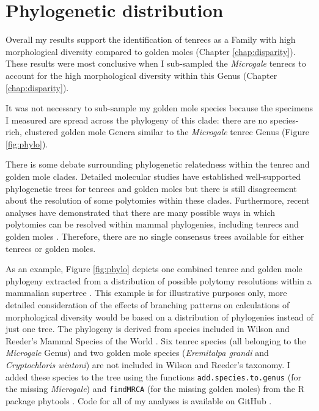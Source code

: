 
\chapter{Phylogenetic distribution}
\label{phylo}

Overall my results support the identification of tenrecs as a Family with high morphological diversity compared to golden moles (Chapter \ref{chap:disparity}). These results were most conclusive when I sub-sampled the \textit{Microgale} tenrecs to account for the high morphological diversity within this Genus (Chapter \ref{chap:disparity}).

It was not necessary to sub-sample my golden mole species because the specimens I measured are spread across the phylogeny of this clade: there are no species-rich, clustered golden mole Genera similar to the \textit{Microgale} tenrec Genus (Figure \ref{fig:phylo}).

There is some debate surrounding phylogenetic relatedness within the tenrec and golden mole clades. Detailed molecular studies have established well-supported phylogenetic trees for tenrecs \citep{Poux2008, Asher2006} and golden moles \citep{Asher2010} but there is still disagreement about the resolution of some polytomies within these clades. Furthermore, recent analyses have demonstrated that there are many possible ways in which polytomies can be resolved within mammal phylogenies, including tenrecs and golden moles \citep{Kuhn2011}. Therefore, there are no single consensus trees available for either tenrecs or golden moles.

As an example, Figure \ref{fig:phylo} depicts one combined tenrec and golden mole phylogeny extracted from a distribution of possible polytomy resolutions \citep{Kuhn2011} within a mammalian supertree \citep{Fritz2009, Bininda2007}. This example is for illustrative purposes only, more detailed consideration of the effects of branching patterns on calculations of morphological diversity would be based on a distribution of phylogenies instead of just one tree. The phylogeny is derived from species included in Wilson and Reeder's Mammal Species of the World \citeyearpar{Wilson2005}. Six tenrec species (all belonging to the \textit{Microgale} Genus) and two golden mole species (\textit{Eremitalpa grandi} and \textit{Cryptochloris wintoni}) are not included in Wilson and Reeder's taxonomy. I added these species to the tree using the functions \texttt{add.species.to.genus} (for the missing \textit{Microgale}) and \texttt{findMRCA} (for the missing golden moles) from the R package phytools \citep{Revell2012}. Code for all of my analyses is available on GitHub \citep{Finlay2015c}. 

